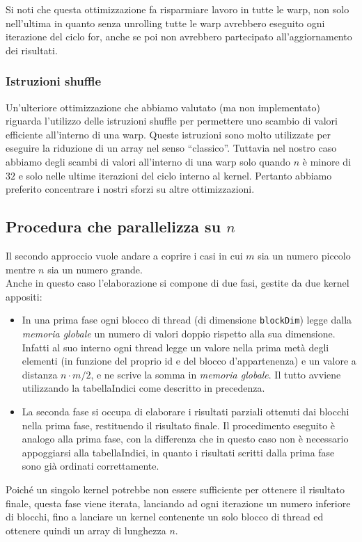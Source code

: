 \documentclass[a4paper]{article}   %
\begin{document}
Si noti che questa ottimizzazione fa risparmiare lavoro in tutte le warp, non solo nell’ultima in quanto senza unrolling tutte le warp avrebbero eseguito ogni iterazione del ciclo for, anche se poi non avrebbero partecipato all’aggiornamento dei risultati.

\subsubsection{Istruzioni shuffle}
Un’ulteriore ottimizzazione che abbiamo valutato (ma non implementato) riguarda l’utilizzo delle istruzioni shuffle per permettere uno scambio di valori efficiente all’interno di una warp. Queste istruzioni sono molto utilizzate per eseguire la riduzione di un array nel senso “classico”. Tuttavia nel nostro caso abbiamo degli scambi di valori all’interno di una warp solo quando $n$ è minore di $32$ e solo nelle ultime iterazioni del ciclo interno al kernel. Pertanto abbiamo preferito concentrare i nostri sforzi su altre ottimizzazioni.

\subsection{Procedura che parallelizza su $n$}
Il secondo approccio vuole andare a coprire i casi in cui $m$ sia un numero piccolo mentre $n$ sia un numero grande. \\
Anche in questo caso l’elaborazione si compone di due fasi, gestite da due kernel appositi:
\begin{itemize}
\item In una prima fase ogni blocco di thread (di dimensione {\tt blockDim}) legge dalla \emph{memoria globale} un numero di valori doppio rispetto alla sua dimensione. Infatti al suo interno ogni thread legge un valore nella prima metà degli elementi (in funzione del proprio id e del blocco d’appartenenza) e un valore a distanza $n \cdot m/2$, e ne scrive la somma in \emph{memoria globale}. Il tutto avviene utilizzando la tabellaIndici come descritto in precedenza.
\item La seconda fase si occupa di elaborare i risultati parziali ottenuti dai blocchi nella prima fase, restituendo il risultato finale. Il procedimento eseguito è analogo alla prima fase, con la differenza che in questo caso non è necessario appoggiarsi alla tabellaIndici, in quanto i risultati scritti dalla prima fase sono già ordinati correttamente. 
\end{itemize}
Poiché un singolo kernel potrebbe non essere sufficiente per ottenere il risultato finale, questa fase viene iterata, lanciando ad ogni iterazione un numero inferiore di blocchi, fino a lanciare un kernel contenente un solo blocco di thread ed ottenere quindi un array di lunghezza $n$. 
\end{document}
